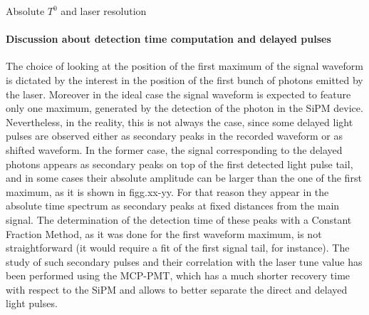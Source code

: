 \documentclass[a4paper,11pt]{article}
\begin{document}
\begin{subsection}{Absolute $T^0$ and laser resolution}
\paragraph{Discussion about detection time computation and delayed pulses}The choice of looking at the position of the first maximum of the signal waveform is dictated by the interest in the position of the first bunch of photons emitted by the laser. Moreover in the ideal case the signal waveform is expected to feature only one maximum, generated by the detection of the photon in the SiPM device. Nevertheless, in the reality, this is not always the case, since some delayed light pulses are observed either as secondary peaks in the recorded waveform or as shifted waveform. In the former case, the signal corresponding to the delayed photons appears as secondary peaks on top of the first detected light pulse tail, and in some cases their absolute amplitude can be larger than the one of the first maximum, as it is shown in figg.xx-yy. For that reason they appear in the absolute time spectrum as secondary peaks at fixed distances from the main signal. The determination of the detection time of these peaks with a Constant Fraction Method, as it was done for the first waveform maximum, is not straightforward (it would require a fit of the first signal tail, for instance). The study of such secondary pulses and their correlation with the laser tune value has been performed using the MCP-PMT, which has a much shorter recovery time with respect to the SiPM and allows to better separate the direct and delayed light pulses.
\end{subsection}
\end{document}
